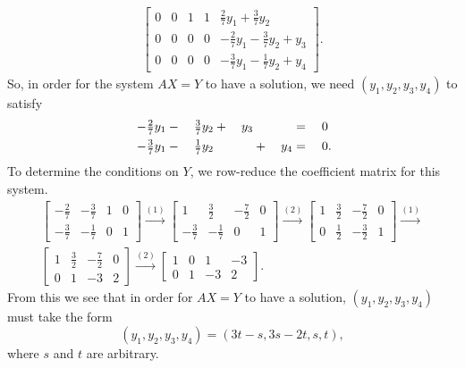 \begin{solution}
\begin{gather*}
\begin{bmatrix}
      0 & 0 & 1 & 1 & \frac27y_1 + \frac37y_2 \\[3pt]
      0 & 0 & 0 & 0 & -\frac27y_1 - \frac37y_2 + y_3 \\[3pt]
      0 & 0 & 0 & 0 & -\frac37y_1 - \frac17y_2 + y_4
    \end{bmatrix}.
  \end{gather*}
  So, in order for the system $AX = Y$ to have a solution, we need
  $(y_1,y_2,y_3,y_4)$ to satisfy
  \begin{alignat*}{5}
    -\tfrac27y_1 &{}-{}& \tfrac37y_2 &{}+{}& y_3 && &{}={}& 0 \\
    -\tfrac37y_1 &{}-{}& \tfrac17y_2 && &{}+{}& y_4 &{}={}& 0\rlap.
  \end{alignat*}
  To determine the conditions on $Y$, we row-reduce the coefficient
  matrix for this system.
  \begin{gather*}
    \begin{bmatrix}
      -\frac27 & -\frac37 & 1 & 0 \\[3pt]
      -\frac37 & -\frac17 & 0 & 1
    \end{bmatrix}
    \xrightarrow{(1)}
    \begin{bmatrix}
      1 & \frac32 & -\frac72 & 0 \\[3pt]
      -\frac37 & -\frac17 & 0 & 1
    \end{bmatrix}
    \xrightarrow{(2)}
    \begin{bmatrix}
      1 & \frac32 & -\frac72 & 0 \\[3pt]
      0 & \frac12 & -\frac32 & 1
    \end{bmatrix}
    \xrightarrow{(1)} \\
    \begin{bmatrix}
      1 & \frac32 & -\frac72 & 0 \\[3pt]
      0 & 1 & -3 & 2
    \end{bmatrix}
    \xrightarrow{(2)}
    \begin{bmatrix}
      1 & 0 & 1 & -3 \\
      0 & 1 & -3 & 2
    \end{bmatrix}.
  \end{gather*}
  From this we see that in order for $AX = Y$ to have a solution,
  $(y_1,y_2,y_3,y_4)$ must take the form
  \begin{equation*}
    (y_1,y_2,y_3,y_4) = (3t - s, 3s - 2t, s, t),
  \end{equation*}
  where $s$ and $t$ are arbitrary.
\end{solution}
